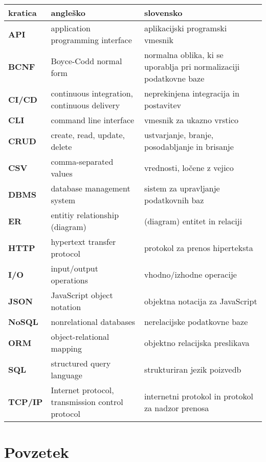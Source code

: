 \documentclass[a4paper,12pt,openright]{book}
\newcommand{\clearemptydoublepage}{\newpage{\pagestyle{empty}\cleardoublepage}}
\begin{document}
\noindent\begin{tabular}{p{}|p{}|p{}}
  {\bf kratica} & {\bf angleško}                              & {\bf slovensko} \\ \hline
  {\bf API} & application programming interface & aplikacijski programski vmesnik \\
  {\bf BCNF} & Boyce-Codd normal form & normalna oblika, ki se uporablja pri normalizaciji podatkovne baze \\
  {\bf CI/CD} & continuous integration, continuous delivery & neprekinjena integracija in postavitev \\
  {\bf CLI} & command line interface & vmesnik za ukazno vrstico \\
  {\bf CRUD} & create, read, update, delete & ustvarjanje, branje, posodabljanje in brisanje \\
  {\bf CSV} & comma-separated values & vrednosti, ločene z vejico \\
  {\bf DBMS} & database management system & sistem za upravljanje podatkovnih baz \\
  {\bf ER} & entitiy relationship (diagram) & (diagram) entitet in relaciji \\
  {\bf HTTP} & hypertext transfer protocol & protokol za prenos hiperteksta \\
  {\bf I/O} & input/output operations & vhodno/izhodne operacije \\
  {\bf JSON} & JavaScript object notation & objektna notacija za JavaScript \\
  {\bf NoSQL} & nonrelational databases & nerelacijske podatkovne baze \\
  {\bf ORM} & object-relational mapping & objektno relacijska preslikava \\
  {\bf SQL} & structured query language & strukturiran jezik poizvedb \\
  {\bf TCP/IP} & Internet protocol, transmission control protocol & internetni protokol in protokol za nadzor prenosa \\
\end{tabular}


\clearemptydoublepage

{}
\chapter*{Povzetek}
\end{document}
